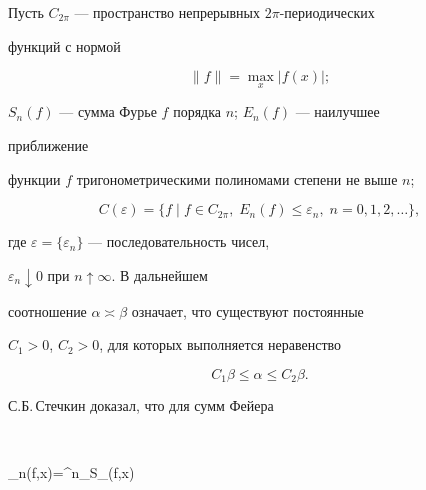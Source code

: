 




\pagestyle{plain} %













\maketitle


\label{begin}





Пусть $C_{2\pi}$ --- пространство непрерывных $2\pi$-периодических


функций с нормой


$$


\|f\|=\max_x |f(x)|;


$$


$S_n(f)$ --- сумма Фурье $f$ порядка $n$; $E_n(f)$ --- наилучшее


приближение


функции $f$ тригонометрическими полиномами степени не выше $n$;


$$


C(\varepsilon)=\{f\mid f\in C_{2\pi},\;E_n(f)\le\varepsilon_n,\;


n=0,1,2,\dotsc\},


$$


где $\varepsilon=\{\varepsilon_n\}$ --- последовательность чисел,


$\varepsilon_n\downarrow 0$ при $n\uparrow\infty$. В дальнейшем


соотношение $\alpha\asymp\beta$ означает, что существуют постоянные


$C_1>0$, $C_2>0$, для которых выполняется неравенство


$$


C_1\beta\le\alpha\le C_2\beta.


$$





С.Б.\,Стечкин \cite{1} доказал, что для сумм Фейера


$$


\sigma_n(f,x)=\sum^n_{}S_\nu(f,x)


